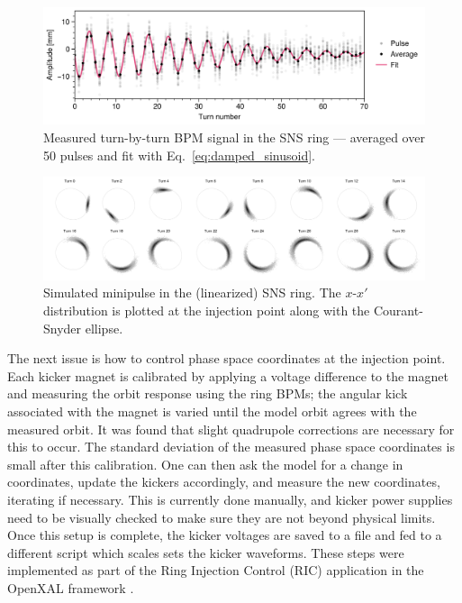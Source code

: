 %
\begin{figure}[!p]
    \centering
    \includegraphics[width=\textwidth]{Images/chapter1/bpm_avg.png}
    \caption{Measured turn-by-turn BPM signal in the SNS ring — averaged over 50 pulses and fit with Eq.~\eqref{eq:damped_sinusoid}.}
    \label{fig:bpm_avg}
\end{figure}
%
%
\begin{figure}
    \centering
    \includegraphics[width=\textwidth]{Images/chapter1/minipulse_chromaticity_black.png}
    \caption{Simulated minipulse in the (linearized) SNS ring. The $x$-$x'$ distribution is plotted at the injection point along with the Courant-Snyder ellipse.}
    \label{fig:minipulse}
\end{figure}
%

The next issue is how to control phase space coordinates at the injection point. Each kicker magnet is calibrated by applying a voltage difference to the magnet and measuring the orbit response using the ring BPMs; the angular kick associated with the magnet is varied until the model orbit agrees with the measured orbit. It was found that slight quadrupole corrections are necessary for this to occur. The standard deviation of the measured phase space coordinates is small after this calibration. One can then ask the model for a change in coordinates, update the kickers accordingly, and measure the new coordinates, iterating if necessary. This is currently done manually, and kicker power supplies need to be visually checked to make sure they are not beyond physical limits. Once this setup is complete, the kicker voltages are saved to a file and fed to a different script which scales sets the kicker waveforms. These steps were implemented as part of the Ring Injection Control (RIC) application in the OpenXAL framework \cite{Milas2021}. 

